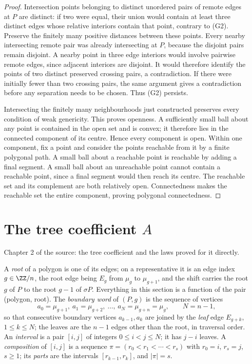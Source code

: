 \begin{proof}
Intersection points belonging to distinct unordered pairs of remote edges at $P$ are
distinct: if two were equal, their union would contain at least three
distinct edges whose relative interiors contain that point, contrary
to (G2). Preserve the finitely many positive distances between these
points. Every nearby intersecting remote pair was already intersecting
at $P$, because the disjoint pairs remain disjoint. A nearby point in
three edge interiors would involve pairwise remote edges, since
adjacent interiors are disjoint. It would therefore identify the
points of two distinct preserved crossing pairs, a contradiction.
If there were initially fewer than two crossing pairs, the same
argument gives a contradiction before any separation needs to be
chosen. Thus (G2) persists.

Intersecting the finitely many neighbourhoods just constructed
preserves every condition of weak genericity. This proves openness.
A sufficiently small ball about any point is contained in the open
set and is convex; it therefore lies in the connected component of
its centre. Hence every component is open. Within one component,
fix a point and consider the points reachable from it by a finite
polygonal path. A small ball about a reachable point is reachable
by adding a final segment. A small ball about an unreachable point
cannot contain a reachable point, since a final segment would then
reach its centre. The reachable set and its complement are both
relatively open. Connectedness makes the reachable set the entire
component, proving polygonal connectedness.
\end{proof}

\chapter{The tree coefficient $A$}
Chapter 2 of the source: the tree coefficient and the laws proved for it directly.

\begin{definition}\label{def:root}\leanok
A \emph{root} of a polygon is one of its edges; on a representative it is an
edge index $g\in\ZZ/n$, the root edge being $E_g$ from $\mu_g$ to
$\mu_{g+1}$, and the shift carries the root $g$ of $P$ to the root $g-1$ of
$\sigma P$. Everything in this section is a function of the pair (polygon,
root). The \emph{boundary word} of $(P,g)$ is the sequence of
vertices
\[
a_0=\mu_{g+1},\ a_1=\mu_{g+2},\ \ldots,\ a_{N}=\mu_{g+n}=\mu_g,\qquad N=n-1,
\]
so that consecutive boundary vertices $a_{k-1},a_k$ are joined by the
\emph{leaf} edge $E_{g+k}$, $1\leq k\leq N$; the leaves are the $n-1$ edges
other than the root, in traversal order. An \emph{interval} is a pair
$[i,j]$ of integers $0\leq i<j\leq N$; it has $j-i$ leaves. A
\emph{composition} of $[i,j]$ is a sequence $\pi=(r_0<r_1<\cdots<r_s)$ with
$r_0=i$, $r_s=j$, $s\geq1$; its \emph{parts} are the intervals
$[r_{k-1},r_k]$, and $|\pi|=s$.
\end{definition}

